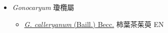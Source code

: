 
  \begin{itemize}
 \item[] \textit{Gonocaryum} 瓊欖屬
                    
  \begin{itemize}
        \item[] \href{http://www.theplantlist.org/tpl1.1/search?q=Gonocaryum+calleryanum}{\textit{G. calleryanum} (Baill.) Becc.}   柿葉茶茱萸 EN
  \end{itemize}
  \end{itemize}
